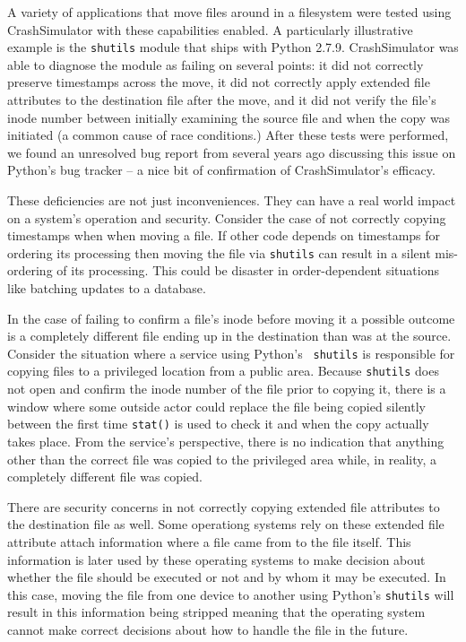     A variety of applications that move files around in a filesystem were tested using CrashSimulator with these
    capabilities enabled.  A particularly illustrative example is the {\tt shutils} module that ships with Python 2.7.9.
    CrashSimulator was able to diagnose the module as failing on several points: it did not correctly preserve
    timestamps across the move, it did not correctly apply extended file attributes to the destination file after the
    move, and it did not verify the file's inode number between initially examining the source file and when the copy
    was initiated (a common cause of race conditions.)  After these tests were performed, we found an unresolved bug
    report from several years ago discussing this issue on Python's bug tracker -- a nice bit of confirmation of
    CrashSimulator's efficacy.

    These deficiencies are not just inconveniences.  They can have a real world impact on a system's operation and
    security.  Consider the case of not correctly copying timestamps when when moving a file.  If other code depends on
    timestamps for ordering its processing then moving the file via {\tt shutils} can result in a silent mis-ordering of
    its processing.  This could be disaster in order-dependent situations like batching updates to a database.

    In the case of failing to confirm a file's inode before moving it a possible outcome is a completely different file
    ending up in the destination than was at the source.  Consider the situation where a service using Python's {\tt
      shutils} is responsible for copying files to a privileged location from a public area.  Because {\tt shutils} does
    not open and confirm the inode number of the file prior to copying it, there is a window where some outside actor
    could replace the file being copied silently between the first time {\tt stat()} is used to check it and when the
    copy actually takes place.  From the service's perspective, there is no indication that anything other than the
    correct file was copied to the privileged area while, in reality, a completely different file was copied.

    There are security concerns in not correctly copying extended file attributes to the destination file as well.  Some
    operationg systems rely on these extended file attribute attach information where a file came from to the file
    itself.  This information is later used by these operating systems to make decision about whether the file should be
    executed or not and by whom it may be executed.  In this case, moving the file from one device to another using
    Python's {\tt shutils} will result in this information being stripped meaning that the operating system cannot make
    correct decisions about how to handle the file in the future.

